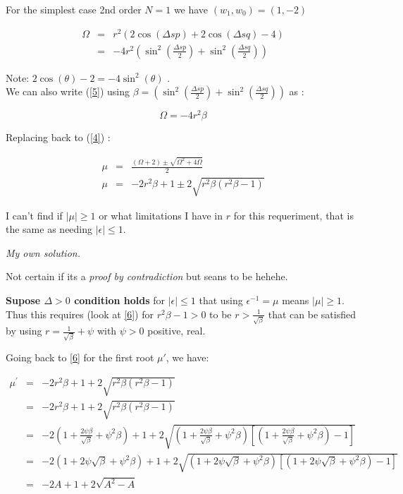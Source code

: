\documentclass[legalpaper, 12pt]{article}
\begin{document}
For the simplest case 2nd order $ N=1 $ we have $ (w_1, w_0) = (1, -2) $

\begin{eqnarray}
\Omega	&=& r^2 \left( 2\cos(\Delta s p) + 2\cos(\Delta s q) - 4\right) \nonumber \\
	&=& -4r^2 \left( \sin^2(\frac{\Delta s p}{2}) + \sin^2(\frac{\Delta s q}{2}) \right) \label{5}
\end{eqnarray}

Note:  $ 2 \cos(\theta) - 2 = -4 \sin ^2 (\theta) $ .\\

We can also write (\ref{5}) using $ \beta = \left( \sin^2(\frac{\Delta s p}{2}) + \sin^2(\frac{\Delta s q}{2}) \right) $ as :

$$ \Omega = -4r^2\beta $$

Replacing back to (\ref{4}) :

\begin{eqnarray}
\mu &=& \frac{(\Omega+2) \pm \sqrt{\Omega^2 + 4\Omega}}{2} \nonumber \\
\mu &=& -2r^2\beta+1 \pm 2\sqrt{r^2\beta(r^2\beta-1)} \label{6}
\end{eqnarray}

I can't find if $ | \mu | \geq 1 $ or what limitations I have in $r$ for this requeriment, that is the same as needing $ | \epsilon | \leq 1  $. 

\newpage

\textit{My own solution.}

Not certain if its a \textit{proof by contradiction} but seans to be hehehe. 

\textbf{Supose $ \Delta > 0 $ condition holds} for $ | \epsilon |  \leq 1 $ that using $ \epsilon^{-1} = \mu $ means $ |\mu| \geq 1 $. Thus this requires (look at \ref{6}) for $ r^2 \beta - 1 > 0 $   to be $ r > \frac{1}{ \sqrt{ \beta} } $  that can be satisfied by using $ r = \frac{1}{ \sqrt{ \beta} } + \psi $ with $ \psi > 0 $ positive, real. 

Going back to \ref{6} for the first root $ \mu{'} $, we have:

\begin{eqnarray}
\mu^{'} &=& -2r^2\beta+1 + 2\sqrt{r^2\beta(r^2\beta-1)} \nonumber \\
	&=& -2r^2\beta+1 + 2\sqrt{r^2\beta(r^2\beta-1)} \nonumber \\
	&=& -2 \left(1+\frac{2\psi\beta}{\sqrt{\beta}} + \psi^2\beta\right)+1+ 2\sqrt{\left(1+\frac{2\psi\beta}{\sqrt{\beta}} + \psi^2\beta\right)\left[\left(1+\frac{2\psi\beta}{\sqrt{\beta}} + \psi^2\beta\right)-1 \right]} \nonumber \\
	&=& -2 	\left(1+2\psi\sqrt{\beta}+\psi^2\beta\right) +1 + 2 \sqrt{\left(1+2\psi\sqrt{\beta}+\psi^2\beta\right)\left[\left(1+2\psi\sqrt{\beta}+\psi^2\beta\right)-1\right]} \nonumber \\
	&=& -2 A + 1 + 2\sqrt{A^2-A} \label{7}
\end{eqnarray}
\end{document}
